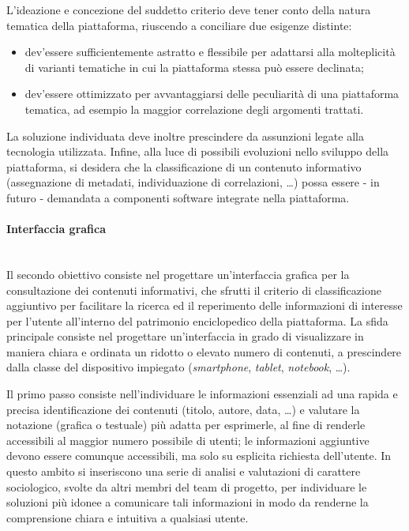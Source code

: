 L'ideazione e concezione del suddetto criterio deve tener conto della natura tematica della piattaforma, riuscendo a conciliare due esigenze distinte:
\begin{itemize}
\item dev'essere sufficientemente astratto e flessibile per adattarsi alla molteplicità di varianti tematiche in cui la piattaforma stessa può essere declinata;
\item dev'essere ottimizzato per avvantaggiarsi delle peculiarità di una piattaforma tematica, ad esempio la maggior correlazione degli argomenti trattati.
\end{itemize}

La soluzione individuata deve inoltre prescindere da assunzioni legate alla tecnologia utilizzata. Infine, alla luce di possibili evoluzioni nello sviluppo della piattaforma, si desidera che la classificazione di un contenuto informativo (assegnazione di metadati, individuazione di correlazioni, \ldots) possa essere - in futuro - demandata a componenti software integrate nella piattaforma.

\paragraph{Interfaccia grafica} \hfill \\
Il secondo obiettivo consiste nel progettare un'interfaccia grafica per la consultazione dei contenuti informativi, che sfrutti il criterio di classificazione aggiuntivo per facilitare la ricerca ed il reperimento delle informazioni di interesse per l'utente all'interno del patrimonio enciclopedico della piattaforma. La sfida principale consiste nel progettare un'interfaccia in grado di visualizzare in maniera chiara e ordinata un ridotto o elevato numero di contenuti, a prescindere dalla classe del dispositivo impiegato (\textit{smartphone}, \textit{tablet}, \textit{notebook}, \ldots).

Il primo passo consiste nell'individuare le informazioni essenziali ad una rapida e precisa identificazione dei contenuti (titolo, autore, data, \ldots) e valutare la notazione (grafica o testuale) più adatta per esprimerle, al fine di renderle accessibili al maggior numero possibile di utenti; le informazioni aggiuntive devono essere comunque accessibili, ma solo su esplicita richiesta dell'utente. In questo ambito si inseriscono una serie di analisi e valutazioni di carattere sociologico, svolte da altri membri del team di progetto, per individuare le soluzioni più idonee a comunicare tali informazioni in modo da renderne la comprensione chiara e intuitiva a qualsiasi utente.


